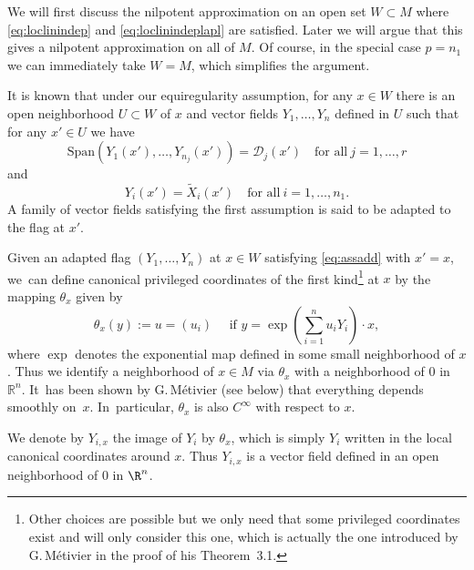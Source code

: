 We will first discuss the nilpotent approximation on an open set $W\subset M$ where \eqref{eq:loclinindep} and \eqref{eq:loclinindeplapl} are satisfied. Later we will argue that this gives a nilpotent approximation on all of $M$. Of course, in the special case $p=n_1$ we can immediately take $W=M$, which simplifies the argument.

It is known that under our equiregularity assumption, for any $x\in W$ there is an open neighborhood $U\subset W$ of $x$ and vector fields $Y_1,\ldots,Y_n$ defined in $U$ such that for any $x'\in U$ we have
\[
\text{Span}(Y_1(x'),\ldots,Y_{n_j}(x'))=\mathcal{D}_j(x')
\quad\text{for all}\ j=1,\ldots, r
\]
and
\begin{equation}\label{eq:assadd}
Y_i(x') =\tilde X_i(x') \quad\text{for all}\ i=1,\ldots,n_1.
\end{equation}
A family of vector fields satisfying the first assumption is said to be adapted to the flag at $x'$.

Given an adapted flag $(Y_1,\ldots,Y_n)$ at $x\in W$ satisfying \eqref{eq:assadd} with $x'=x$, we~can define canonical privileged coordinates of the first kind\footnote{Other choices are possible but we only need that some privileged coordinates exist and will only consider this one, which is actually the one introduced by G.\,Métivier \cite{Me} in the proof of his Theorem~3.1.} at $x$ by the mapping $\theta_x$ given by
\begin{equation} \label{eq:pc}
\theta_x (y) := u = (u_{i}) \quad\mbox{ if } y = \exp (\sum_{i=1}^n u_{i}Y_i) \cdot x,
\end{equation} where $\exp$ denotes the exponential map defined in some small neighborhood of $x$.
Thus we identify a neighborhood of $x\in M$ via $\theta_x$ with a neighborhood of $0$ in $\mathbb R^n$. It~has been shown by G.\,Métivier (see below) that everything depends smoothly on~$x$. In~particular, $\theta_x$ is also $C^\infty$ with respect to $x$.

We denote by $Y_{i,x}$ the image of $Y_i$ by $\theta_x$,
which is simply $Y_i$ written in the local canonical coordinates around $x$. Thus $Y_{i,x}$ is a vector field defined in an open neighborhood of $0$ in $\R^n$.

